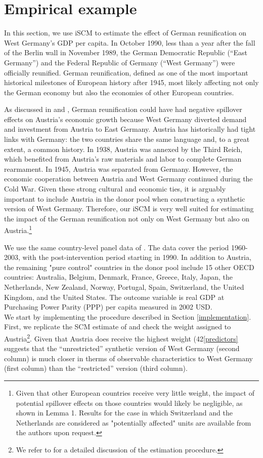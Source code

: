 \section{Empirical example}\label{example}
In this section, we use iSCM to estimate the effect of German reunification on West Germany's  GDP per capita. In October 1990, less than a year after the fall of the Berlin wall in November 1989, the German Democratic Republic (``East Germany'') and the Federal Republic of Germany (``West Germany'') were officially reunified.
German reunification, defined as one of the most important historical milestones of European history after 1945, most likely affecting not only the German economy but also the economies of other European countries.

As discussed in \cite{Aba2015} and \cite{Aba2019}, German reunification could have had negative spillover effects on Austria's economic growth because West Germany diverted demand and investment from Austria to East Germany. Austria has historically had tight links with Germany: the two countries share the same language and, to a great extent,  a common history. In 1938, Austria was annexed by the Third Reich, which benefited from Austria's raw materials and labor to complete German rearmament. In 1945, Austria was separated from Germany. However, the economic cooperation between Austria and West Germany continued during the Cold War. 
Given these strong cultural and economic ties, it is arguably important to include Austria in the donor pool when constructing a synthetic version of West Germany. Therefore, our iSCM is very well suited for estimating the impact of the German reunification not only on West Germany but also on Austria.\footnote{Given that other European countries receive very little weight, the impact of potential spillover effects on those countries would likely be negligible, as shown in Lemma 1. Results for the case in which Switzerland and the Netherlands are considered as "potentially affected"  units are available from the authors upon request.}

We use the same country-level panel data of \cite{Aba2015}. The data cover the period 1960-2003, with the post-intervention period starting in 1990. In addition to Austria, the remaining "pure control" countries in the donor pool include 15 other OECD countries: Australia, Belgium, Denmark, France, Greece, Italy, Japan, the Netherlands, New Zealand, Norway, Portugal, Spain, Switzerland, the United Kingdom, and the United States. The outcome variable is real  GDP  at Purchasing Power Parity (PPP) per capita measured in 2002 USD.\\
We start by implementing the procedure described in Section \ref{implementation}. First, we replicate the SCM estimate of \cite{Aba2015} and check the weight assigned to Austria\footnote{We refer to \cite{Aba2015} for a detailed discussion of the estimation procedure.}. Given that Austria does receive the highest weight (42\Table \ref{predictors} suggests that the ``unrestricted''  synthetic version of West Germany (second column) is much closer in therms of observable characteristics to  West Germany (first column) than the ``restricted'' version (third column).

